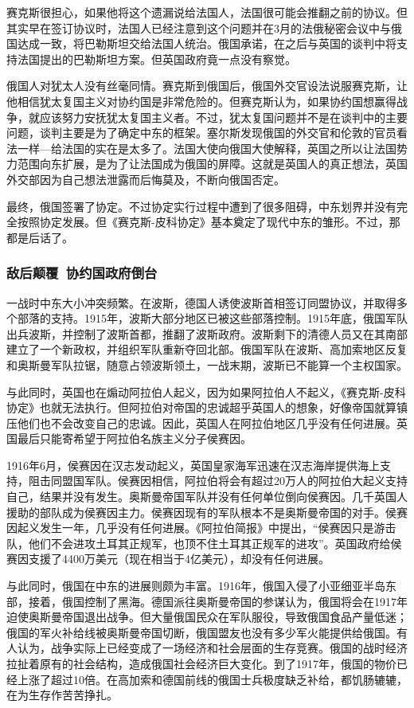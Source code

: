 \documentclass{article}
\begin{document}
赛克斯很担心，如果他将这个遗漏说给法国人，法国很可能会推翻之前的协议。但其实早在签订协议时，法国人已经注意到这个问题并在3月的法俄秘密会议中与俄国达成一致，将巴勒斯坦交给法国人统治。俄国承诺，在之后与英国的谈判中将支持法国提出的巴勒斯坦方案。但英国政府竟一点没有察觉。

俄国人对犹太人没有丝毫同情。赛克斯到俄国后，俄国外交官设法说服赛克斯，让他相信犹太复国主义对协约国是非常危险的。但赛克斯认为，如果协约国想赢得战争，就应该努力安抚犹太复国主义者。不过，犹太复国问题并不是在谈判中的主要问题，谈判主要是为了确定中东的框架。塞尔斯发现俄国的外交官和伦敦的官员看法一样---给法国的实在是太多了。法国大使向俄国大使解释，英国之所以让法国势力范围向东扩展，是为了让法国成为俄国的屏障。这就是英国人的真正想法，英国外交部因为自己想法泄露而后悔莫及，不断向俄国否定。

最终，俄国签署了协定。不过协定实行过程中遭到了很多阻碍，中东划界并没有完全按照协定发展。但《赛克斯-皮科协定》基本奠定了现代中东的雏形。不过，那都是后话了。

\subsubsection{敌后颠覆\ 协约国政府倒台}
一战时中东大小冲突频繁。在波斯，德国人诱使波斯首相签订同盟协议，并取得多个部落的支持。1915年，波斯大部分地区已被这些部落控制。1915年底，俄国军队出兵波斯，并控制了波斯首都，推翻了波斯政府。波斯剩下的清德人员又在其南部建立了一个新政权，并组织军队重新夺回北部。俄国军队在波斯、高加索地区反复和奥斯曼军队拉锯，随意占领波斯领土，一战末期，波斯已不能算一个主权国家。

与此同时，英国也在煽动阿拉伯人起义，因为如果阿拉伯人不起义，《赛克斯-皮科协定》也就无法执行。但阿拉伯对帝国的忠诚超乎英国人的想象，好像帝国就算镇压他们也不会改变自己的忠诚。因此，英国人在阿拉伯地区几乎没有任何进展。英国最后只能寄希望于阿拉伯名族主义分子侯赛因。

1916年6月，侯赛因在汉志发动起义，英国皇家海军迅速在汉志海岸提供海上支持，阻击同盟国军队。侯赛因相信，阿拉伯将会有超过20万人的阿拉伯大起义支持自己，结果并没有发生。奥斯曼帝国军队并没有任何单位倒向侯赛因。几千英国人援助的部队成为侯赛因主力。侯赛因现有的军队根本不是奥斯曼帝国的对手。侯赛因起义发生一年，几乎没有任何进展。《阿拉伯简报》中提出，“侯赛因只是游击队，他们不会进攻土耳其正规军，也顶不住土耳其正规军的进攻”。英国政府给侯赛因支援了4400万美元（现在相当于4亿美元），却没有任何进展。

与此同时，俄国在中东的进展则颇为丰富。1916年，俄国入侵了小亚细亚半岛东部，接着，俄国控制了黑海。德国派往奥斯曼帝国的参谋认为，俄国将会在1917年迫使奥斯曼帝国退出战争。但大量俄国民众在军队服役，导致俄国食品产量低迷；俄国的军火补给线被奥斯曼帝国切断，俄国盟友也没有多少军火能提供给俄国。有人认为，战争实际上已经变成了一场经济和社会层面的生存竞赛。俄国的战时经济拉扯着原有的社会结构，造成俄国社会经济巨大变化。到了1917年，俄国的物价已经上涨了超过10倍。在高加索和德国前线的俄国士兵极度缺乏补给，都饥肠辘辘，在为生存作苦苦挣扎。
\end{document}
